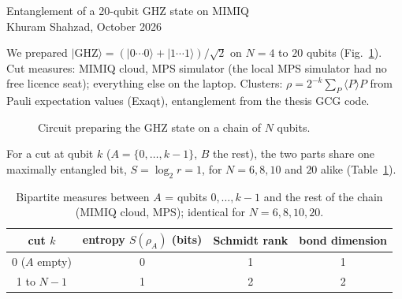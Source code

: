 \documentclass[11pt,a4paper]{article}
\begin{document}
\begin{center}
{\large Entanglement of a 20-qubit GHZ state on MIMIQ}\\[4pt]
Khuram Shahzad, October 2026
\end{center}

We prepared $|\mathrm{GHZ}\rangle = (|0\cdots0\rangle + |1\cdots1\rangle)/\sqrt{2}$ on
$N = 4$ to $20$ qubits (Fig.~\ref{fig:circuit}). Cut measures: MIMIQ cloud, MPS simulator
(the local MPS simulator had no free licence seat); everything else on the laptop.
Clusters: $\rho = 2^{-k}\sum_P \langle P\rangle P$ from Pauli expectation values (Exaqt),
entanglement from the thesis GCG code.

\begin{figure}[h!]
\centering
{}
\caption{Circuit preparing the GHZ state on a chain of $N$ qubits.}
\label{fig:circuit}
\end{figure}

For a cut at qubit $k$ ($A = \{0,\dots,k-1\}$, $B$ the rest), the two parts share one
maximally entangled bit, $S = \log_2 r = 1$, for $N = 6, 8, 10$ and $20$ alike
(Table~\ref{tab:cuts}).

\begin{table}[h!]
\centering
\small
\begin{tabular}{cccc}
  \toprule
  cut $k$ & entropy $S(\rho_A)$ (bits) & Schmidt rank & bond dimension \\
  \midrule
  0 ($A$ empty) & 0 & 1 & 1 \\
  1 to $N-1$    & 1 & 2 & 2 \\
  \bottomrule
\end{tabular}
\caption{Bipartite measures between $A$ = qubits $0,\dots,k-1$ and the rest of the chain (MIMIQ cloud, MPS); identical for $N = 6, 8, 10, 20$.}
\label{tab:cuts}
\end{table}
\end{document}
